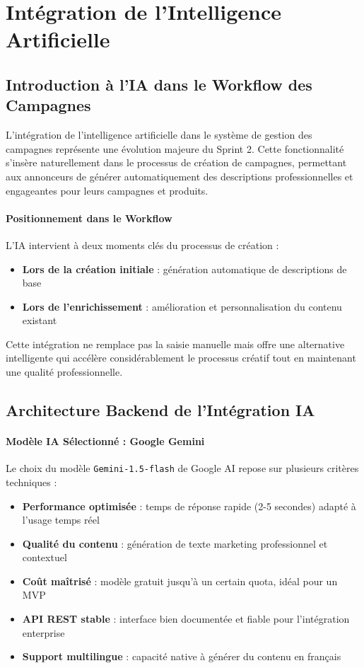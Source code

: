 \section{Intégration de l'Intelligence Artificielle}

\subsection{Introduction à l'IA dans le Workflow des Campagnes}

L'intégration de l'intelligence artificielle dans le système de gestion des campagnes représente une évolution majeure du Sprint 2. Cette fonctionnalité s'insère naturellement dans le processus de création de campagnes, permettant aux annonceurs de générer automatiquement des descriptions professionnelles et engageantes pour leurs campagnes et produits.

\paragraph{Positionnement dans le Workflow}
L'IA intervient à deux moments clés du processus de création :
\begin{itemize}[label=\textbullet]
    \item \textbf{Lors de la création initiale} : génération automatique de descriptions de base
    \item \textbf{Lors de l'enrichissement} : amélioration et personnalisation du contenu existant
\end{itemize}

Cette intégration ne remplace pas la saisie manuelle mais offre une alternative intelligente qui accélère considérablement le processus créatif tout en maintenant une qualité professionnelle.

\subsection{Architecture Backend de l'Intégration IA}

\paragraph{Modèle IA Sélectionné : Google Gemini}
Le choix du modèle \texttt{Gemini-1.5-flash} de Google AI repose sur plusieurs critères techniques :
\begin{itemize}[label=\textbullet]
    \item \textbf{Performance optimisée} : temps de réponse rapide (2-5 secondes) adapté à l'usage temps réel
    \item \textbf{Qualité du contenu} : génération de texte marketing professionnel et contextuel
    \item \textbf{Coût maîtrisé} : modèle gratuit jusqu'à un certain quota, idéal pour un MVP
    \item \textbf{API REST stable} : interface bien documentée et fiable pour l'intégration enterprise
    \item \textbf{Support multilingue} : capacité native à générer du contenu en français
\end{itemize}

